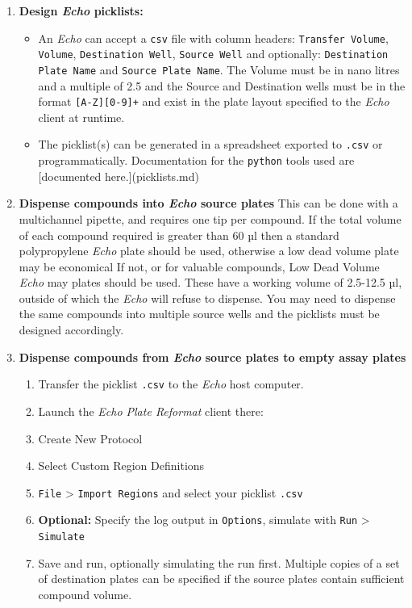 \documentclass{article}
\begin{document}
\begin{enumerate}
	\item \textbf{Design \textit{Echo} picklists:}
	\begin{itemize}
		\item An \textit{Echo} can accept a \texttt{csv} file with column headers: \texttt{Transfer Volume}, \texttt{Volume}, \texttt{Destination Well}, \texttt{Source Well} and optionally: \texttt{Destination Plate Name} and \texttt{Source Plate Name}.
			The Volume must be in nano litres and a multiple of 2.5 and the Source and Destination wells must be in the format \texttt{[A-Z][0-9]+} and exist in the plate layout specified to the \textit{Echo} client at runtime.

		\item The picklist(s) can be generated in a spreadsheet exported to \texttt{.csv} or programmatically.
			Documentation for the \texttt{python} tools used are [documented here.](picklists.md)
	\end{itemize}
\item \textbf{Dispense compounds into \textit{Echo} source plates}
	This can be done with a multichannel pipette, and requires one tip per compound. 
		If the total volume of each compound required is greater than 60 µl then a standard polypropylene \textit{Echo} plate should be used, otherwise a low dead volume plate may be economical
		If not, or for valuable compounds, Low Dead Volume \textit{Echo} may plates should be used.
		These have a working volume of 2.5-12.5 µl, outside of which the \textit{Echo} will refuse to dispense.
	You may need to dispense the same compounds into multiple source wells and the picklists must be designed accordingly.

\item \textbf{Dispense compounds from \textit{Echo} source plates to empty assay plates}
		\begin{enumerate}
			\item Transfer the picklist \texttt{.csv} to the \textit{Echo} host computer.
			\item Launch the \textit{Echo Plate Reformat} client there:
			\item Create New Protocol 
			\item Select Custom Region Definitions
			\item \texttt{File} > \texttt{Import Regions} and select your picklist \texttt{.csv}
			\item \textbf{Optional:} Specify the log output in \texttt{Options}, simulate with \texttt{Run} > \texttt{Simulate} 
			\item Save and run, optionally simulating the run first. 
			Multiple copies of a set of destination plates can be specified if the source plates contain sufficient compound volume.
		\end{enumerate}


\end{enumerate}
\end{document}
